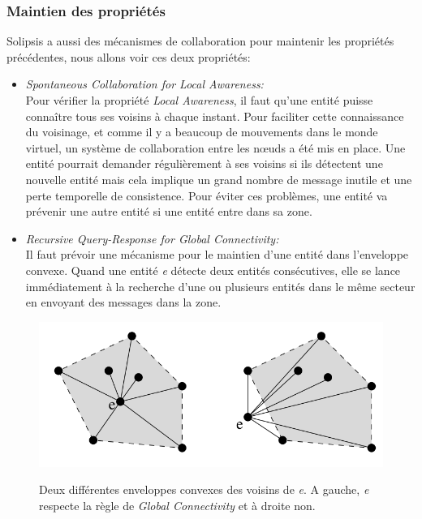		\subsubsection{Maintien des propriétés}
Solipsis a aussi des mécanismes de collaboration pour maintenir les propriétés précédentes, nous allons voir ces deux propriétés:
	\begin{itemize}
	\renewcommand{\labelitemi}{$\bullet$}
		\item \textit{Spontaneous Collaboration for Local Awareness:}\\
		 Pour vérifier la propriété \textit{Local Awareness}, il faut qu'une entité puisse connaître tous ses voisins à chaque instant. Pour faciliter cette connaissance du voisinage, et comme il y a beaucoup de mouvements dans le monde virtuel, un système de collaboration entre les nœuds a été mis en place. Une entité pourrait demander régulièrement à ses voisins si ils détectent une nouvelle entité mais cela implique un grand nombre de message inutile et une perte temporelle de consistence. Pour éviter ces problèmes, une entité va prévenir une autre entité si une entité entre dans sa zone.
		\item \textit{Recursive Query-Response for Global Connectivity:}\\
		Il faut prévoir une mécanisme pour le maintien d'une entité dans l'enveloppe convexe. Quand une entité \textit{e} détecte deux entités consécutives, elle se lance immédiatement à la recherche d'une ou plusieurs entités dans le même secteur en envoyant des messages dans la zone. \\ 
	\end{itemize}
        \vspace{1cm}
        \begin{figure}[!h]
	\centering
        \includegraphics[scale=0.8]{../Images/envelop_convex1.png}\\
        \caption{Deux différentes enveloppes convexes des voisins de \textit{e}. A gauche, \textit{e} respecte la règle de \textit{Global Connectivity} et à droite non.}
        \label{Envelop_Convex}
        \end{figure}
